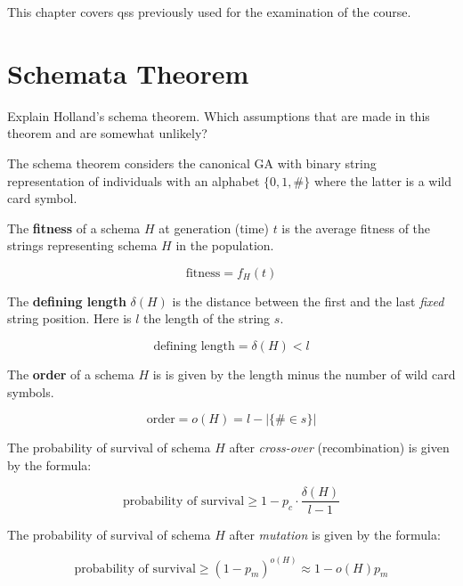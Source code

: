 \documentclass[../main.tex]{subfiles}
\begin{document}
This chapter covers qss previously used for the examination of the course.

\section{Schemata Theorem}

\begin{question}
Explain Holland's schema theorem. Which assumptions that are made in this theorem and are somewhat unlikely?
\end{question}
\begin{solution}
The schema theorem considers the canonical GA with binary string representation of individuals with an alphabet
$\{0,1,\#\}$ where the latter is a wild card symbol.

The \textbf{fitness} of a schema $H$ at generation (time) $t$ is the average fitness of the strings representing schema
$H$ in the population.

\begin{equation}
\text{fitness} = f_{H}(t)
\end{equation}

The \textbf{defining length} $\delta(H)$ is the distance between the first and the last \emph{fixed} string position.
Here is $l$ the length of the string $s$.

\begin{equation}
    \text{defining length} = \delta(H) < l
\end{equation}

The \textbf{order} of a schema $H$ is is given by the length minus the number of wild card symbols.

\begin{equation}
    \text{order} = o(H) = l - |\{ \# \in s \}|
\end{equation}

The probability of survival of schema $H$ after \emph{cross-over} (recombination) is given by the formula:

\begin{equation}
    \text{probability of survival} \geq 1 - p_c \cdot \frac{\delta(H)}{l-1}
\end{equation}

The probability of survival of schema $H$ after \emph{mutation} is given by the formula:

\begin{equation}
    \text{probability of survival} \geq (1-p_m)^{o(H)} \approx 1 - o(H)p_m
\end{equation}


\end{solution}
\end{document}
